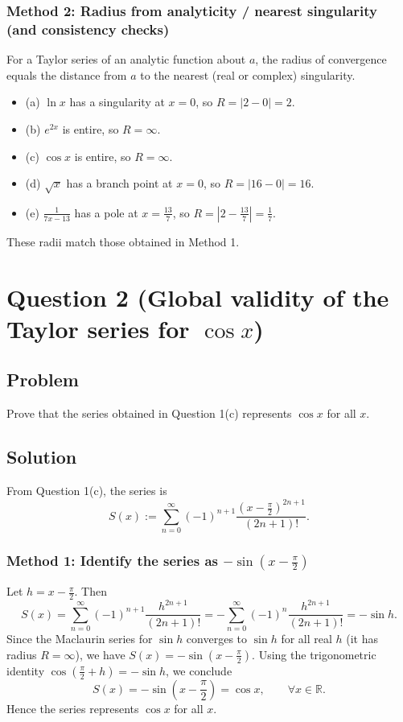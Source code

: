 \documentclass[12pt]{article}
\newcommand{\R}{\mathbb{R}}
\begin{document}
\subsubsection*{Method 2: Radius from analyticity / nearest singularity (and consistency checks)}
For a Taylor series of an analytic function about \(a\), the radius of convergence equals the distance from \(a\) to the nearest (real or complex) singularity.
\begin{itemize}[leftmargin=*]
  \item (a) \(\ln x\) has a singularity at \(x=0\), so \(R=|2-0|=2\).
  \item (b) \(e^{2x}\) is entire, so \(R=\infty\).
  \item (c) \(\cos x\) is entire, so \(R=\infty\).
  \item (d) \(\sqrt{x}\) has a branch point at \(x=0\), so \(R=|16-0|=16\).
  \item (e) \(\frac{1}{7x-13}\) has a pole at \(x=\frac{13}{7}\), so \(R=\left|2-\frac{13}{7}\right|=\frac{1}{7}\).
\end{itemize}
These radii match those obtained in Method 1.

\newpage
\section*{Question 2 (Global validity of the Taylor series for \(\cos x\))}
\subsection*{Problem}
Prove that the series obtained in Question 1(c) represents \(\cos x\) for all \(x\).

\subsection*{Solution}
From Question 1(c), the series is
\[
S(x):=\sum_{n=0}^{\infty}(-1)^{n+1}\frac{\left(x-\frac{\pi}{2}\right)^{2n+1}}{(2n+1)!}.
\]

\subsubsection*{Method 1: Identify the series as \(-\sin\!\left(x-\frac{\pi}{2}\right)\)}
Let \(h=x-\frac{\pi}{2}\). Then
\[
S(x)=\sum_{n=0}^{\infty}(-1)^{n+1}\frac{h^{2n+1}}{(2n+1)!}
=-\sum_{n=0}^\infty (-1)^n\frac{h^{2n+1}}{(2n+1)!}
=-\sin h.
\]
Since the Maclaurin series for \(\sin h\) converges to \(\sin h\) for all real \(h\) (it has radius \(R=\infty\)), we have \(S(x)=-\sin(x-\frac{\pi}{2})\).
Using the trigonometric identity \(\cos\!\left(\frac{\pi}{2}+h\right)=-\sin h\), we conclude
\[
S(x)=-\sin\!\left(x-\frac{\pi}{2}\right)=\cos x,\qquad \forall x\in\R.
\]
Hence the series represents \(\cos x\) for all \(x\).
\end{document}
